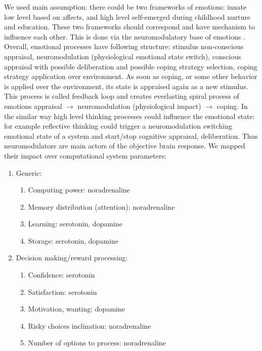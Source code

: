 We used main assumption: there could be two frameworks of emotions: innate low level based on affects, and high level self-emerged during childhood nurture and education. These two frameworks should correspond and have mechanism to influence each other. This is done via the neuromodulatory base of emotions \cite{cubeofemotions, neuromodulatory}.
Overall, emotional processes have following structure: stimulus non-conscious appraisal, neuromodulation (physiological emotional state switch), conscious appraisal with possible deliberation and possible coping strategy selection, coping strategy application over environment. As soon as coping, or some other behavior is applied over the environment, its state is appraised again as a new stimulus. This process is called feedback loop \cite{natureofemotions} and creates everlasting spiral process of emotions appraisal $\rightarrow$ neuromodulation (physiological impact) $\rightarrow$ coping. In the similar way high level thinking processes could influence the emotional state: for example reflective thinking could trigger a neuromodulation switching emotional state of a system and start/stop cognitive appraisal, deliberation.
Thus neuromodulators are main actors of the objective brain response. We mapped their impact over computational system parameters:

\begin{enumerate}
 \item  Generic:
 \begin{enumerate}
  \item  Computing power: noradrenaline
  \item  Memory distribution (attention): noradrenaline
  \item  Learning: serotonin, dopamine
  \item  Storage: serotonin, dopamine
 \end{enumerate}
 \item  Decision making/reward processing:
 \begin{enumerate}
  \item  Confidence: serotonin
  \item  Satisfaction: serotonin
  \item  Motivation, wanting: dopamine
  \item  Risky choices inclination: noradrenaline
  \item  Number of options to process: noradrenaline
 \end{enumerate}
\end{enumerate}


